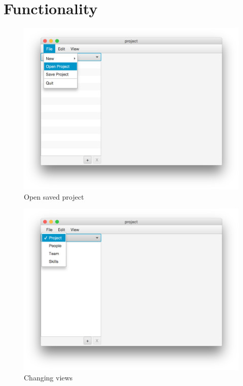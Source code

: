\section{Functionality}


\begin{figure}[H]
\centering
\includegraphics[width=\textwidth]{images/screenshots/screenshot2.png}
\caption{Open saved project}
\label{fig:open_project}
\end{figure}

\begin{figure}[H]
\centering
\includegraphics[width=\textwidth]{images/screenshots/screenshot3.png}
\caption{Changing views}
\label{fig:change_view}
\end{figure}

